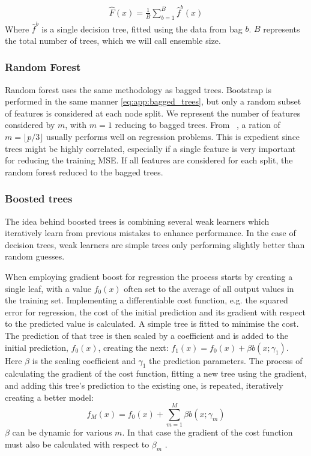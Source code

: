             \begin{align}
                \hat{F}(x) = \frac{1}{B}\sum_{b = 1}^{B} \hat{f}^b (x) \label{eq:app:bagged_trees}
            \end{align}
            Where $\hat{f}^b$ is a single decision tree, fitted using the data from bag $b$. $B$ represents the total number of trees, which we will call ensemble size.

            \subsubsection{Random Forest}
            Random forest uses the same methodology as bagged trees. Bootstrap is performed in the same manner \cref{eq:app:bagged_trees}, but only a random subset of features is considered at each node split. We represent the number of features considered by $m$, with $m = 1$ reducing to bagged trees. From ~\citep{hastie01statisticallearning}, a ration of $m = \lfloor p/3 \rfloor$ usually performs well on regression problems. This is expedient since trees might be highly correlated, especially if a single feature is very important for reducing the training MSE. If all features are considered for each split, the random forest reduced to the bagged trees.
            
            \subsubsection{Boosted trees}
                The idea behind boosted trees is combining several weak learners which iteratively learn from previous mistakes to enhance performance. In the case of decision trees, weak learners are simple trees only performing slightly better than random guesses. 

                When employing gradient boost for regression the process starts by creating a single leaf, with a value $f_0(x)$ often set to the average of all output values in the training set. Implementing a differentiable cost function, e.g. the squared error for regression, the cost of the initial prediction and its gradient with respect to the predicted value is calculated. A simple tree is fitted to minimise the cost. The prediction of that tree is then scaled by a coefficient and is added to the initial prediction, $f_0(x)$, creating the next: $f_1(x) = f_0(x) + \beta b(x;\gamma_1)$. Here $\beta$ is the scaling coefficient and $\gamma_1$ the prediction parameters. The process of calculating the gradient of the cost function, fitting a new tree using the gradient, and adding this tree's prediction to the existing one, is repeated, iteratively creating a better model: 
                \begin{equation}
                    f_M(x) = f_0(x) + \sum_{m=1}^M \beta b(x; \gamma_m)
                \end{equation}
                $\beta$ can be dynamic for various $m$. In that case the gradient of the cost function must also be calculated with respect to $\beta_m$ \citep{hastie01statisticallearning}. 

